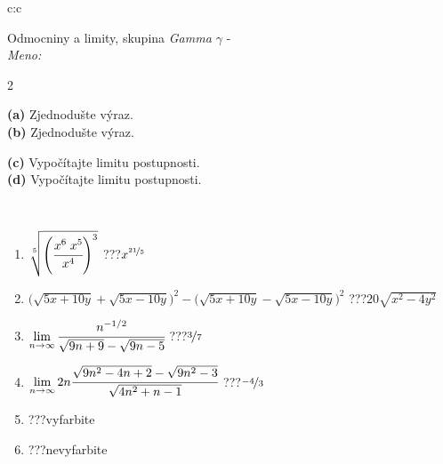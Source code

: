 \documentclass[10pt]{report}
\begin{document}
\begin{tabular}{c:c}
\begin{minipage}[c][104.5mm][t]{0.5\linewidth}
\begin{center}
\vspace{7mm}
{\huge Odmocniny a limity, skupina \textit{Gamma $\gamma$} -}\\[5mm]
\textit{Meno:}\phantom{xxxxxxxxxxxxxxxxxxxxxxxxxxxxxxxxxxxxxxxxxxxxxxxxxxxxxxxxxxxxxxxxx}\\[5mm]
\begin{minipage}{0.95\linewidth}
\begin{center}
{\small \begin{multicols}{2} \raggedright
\textbf{(a)} Zjednodušte výraz. \\[1mm]
\textbf{(b)} Zjednodušte výraz. \par \columnbreak
\textbf{(c)} Vypočítajte limitu postupnosti. \\[1mm]
\textbf{(d)} Vypočítajte limitu postupnosti.
\end{multicols}
}
\end{center}
\end{minipage}
\\[4mm]
\begin{minipage}{0.79\linewidth}
\begin{center}
\begin{varwidth}{\linewidth}
\begin{enumerate}
\small
\item $\sqrt[5]{\left(\cfrac{x^{6}\;x^{5}}{x^{4}}\right)^{3}}$\quad \dotfill\; ???\;\dotfill \quad $x^{\nicefrac{21}{5}}$
\item {\footnotesize{\scriptsize$\big(\sqrt{5x+10y}+\sqrt{5x-10y}\big)^2-\big(\sqrt{5x+10y}-\sqrt{5x-10y}\big)^2$}\quad \dotfill\; ???\;\dotfill \quad $20\sqrt{x^2-4y^2}$}
\item $\lim\limits_{n\to\infty}\cfrac{n^{-1/2}}{\sqrt{9n+9}-\sqrt{9n-5}}$\quad \dotfill\; ???\;\dotfill \quad $\nicefrac{3}{7}$
\item $\lim\limits_{n\to\infty}2n\cfrac{\sqrt{9n^2-4n+2}-\sqrt{9n^2-3}}{\sqrt{4n^2+n-1}}$\quad \dotfill\; ???\;\dotfill \quad $\nicefrac{-4}{3}$
\item \quad \dotfill\; ???\;\dotfill \quad vyfarbite
\item \quad \dotfill\; ???\;\dotfill \quad nevyfarbite
\end{enumerate}
\end{varwidth}
\end{center}
\end{minipage}

\end{center}
\end{minipage}
\end{tabular}
\end{document}
